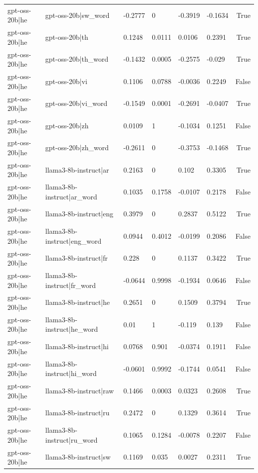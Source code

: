 \begin{table}
\begin{tabular}{llllllr}
gpt-oss-20b|he & gpt-oss-20b|sw_word & -0.2777 & 0 & -0.3919 & -0.1634 & True \\
gpt-oss-20b|he & gpt-oss-20b|th & 0.1248 & 0.0111 & 0.0106 & 0.2391 & True \\
gpt-oss-20b|he & gpt-oss-20b|th_word & -0.1432 & 0.0005 & -0.2575 & -0.029 & True \\
gpt-oss-20b|he & gpt-oss-20b|vi & 0.1106 & 0.0788 & -0.0036 & 0.2249 & False \\
gpt-oss-20b|he & gpt-oss-20b|vi_word & -0.1549 & 0.0001 & -0.2691 & -0.0407 & True \\
gpt-oss-20b|he & gpt-oss-20b|zh & 0.0109 & 1 & -0.1034 & 0.1251 & False \\
gpt-oss-20b|he & gpt-oss-20b|zh_word & -0.2611 & 0 & -0.3753 & -0.1468 & True \\
gpt-oss-20b|he & llama3-8b-instruct|ar & 0.2163 & 0 & 0.102 & 0.3305 & True \\
gpt-oss-20b|he & llama3-8b-instruct|ar_word & 0.1035 & 0.1758 & -0.0107 & 0.2178 & False \\
gpt-oss-20b|he & llama3-8b-instruct|eng & 0.3979 & 0 & 0.2837 & 0.5122 & True \\
gpt-oss-20b|he & llama3-8b-instruct|eng_word & 0.0944 & 0.4012 & -0.0199 & 0.2086 & False \\
gpt-oss-20b|he & llama3-8b-instruct|fr & 0.228 & 0 & 0.1137 & 0.3422 & True \\
gpt-oss-20b|he & llama3-8b-instruct|fr_word & -0.0644 & 0.9998 & -0.1934 & 0.0646 & False \\
gpt-oss-20b|he & llama3-8b-instruct|he & 0.2651 & 0 & 0.1509 & 0.3794 & True \\
gpt-oss-20b|he & llama3-8b-instruct|he_word & 0.01 & 1 & -0.119 & 0.139 & False \\
gpt-oss-20b|he & llama3-8b-instruct|hi & 0.0768 & 0.901 & -0.0374 & 0.1911 & False \\
gpt-oss-20b|he & llama3-8b-instruct|hi_word & -0.0601 & 0.9992 & -0.1744 & 0.0541 & False \\
gpt-oss-20b|he & llama3-8b-instruct|raw & 0.1466 & 0.0003 & 0.0323 & 0.2608 & True \\
gpt-oss-20b|he & llama3-8b-instruct|ru & 0.2472 & 0 & 0.1329 & 0.3614 & True \\
gpt-oss-20b|he & llama3-8b-instruct|ru_word & 0.1065 & 0.1284 & -0.0078 & 0.2207 & False \\
gpt-oss-20b|he & llama3-8b-instruct|sw & 0.1169 & 0.035 & 0.0027 & 0.2311 & True \\

\end{tabular}
\end{table}
